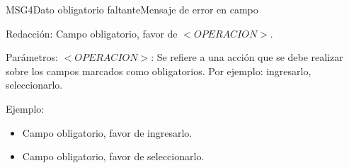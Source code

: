    
\begin{mensaje}{MSG4}{Dato obligatorio faltante}{Mensaje de error en campo}
	\item[Redacción:] Campo obligatorio, favor de $<OPERACION>$.
    \item[Parámetros:] $<OPERACION>$: Se refiere a una acción que se debe realizar sobre los campos marcados como obligatorios. Por ejemplo: ingresarlo, seleccionarlo.
    

    \item[Ejemplo:]\begin{itemize}
        
        \item Campo obligatorio, favor de ingresarlo.  
        \item Campo obligatorio, favor de seleccionarlo.
    \end{itemize} 
\end{mensaje}


